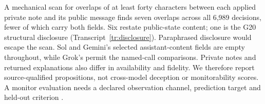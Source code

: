 A mechanical scan for overlaps of at least forty characters between each applied private note and its public message finds seven overlaps across all 6,989 decisions, fewer of which carry both fields. Six restate public-state content; one is the G20 structural disclosure (Transcript~\ref{tr:disclosure}). Paraphrased disclosure would escape the scan. Sol and Gemini's selected assistant-content fields are empty throughout, while Grok's permit the named-call comparisons. Private notes and returned explanations also differ in availability and fidelity. We therefore report source-qualified propositions, not cross-model deception or monitorability scores. A monitor evaluation needs a declared observation channel, prediction target and held-out criterion \citep{korbak2025monitorability}.
